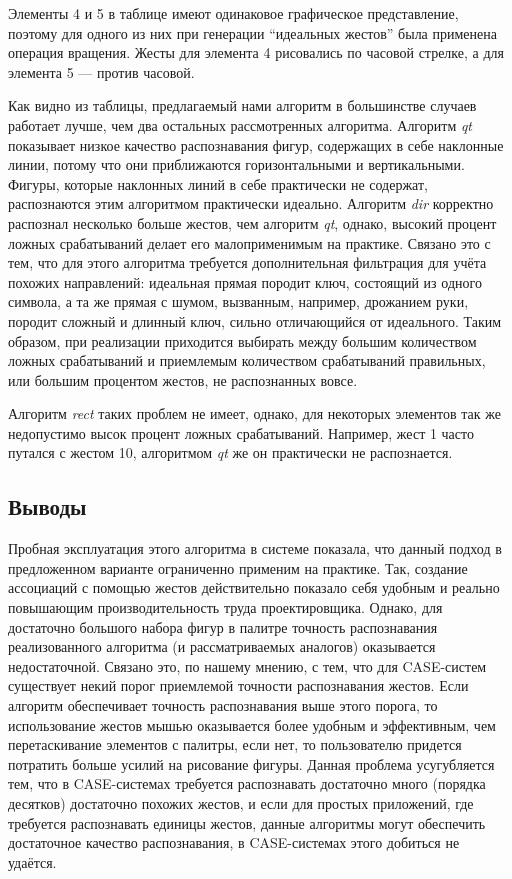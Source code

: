 \documentclass[a5paper]{article}
\begin{document}
Элементы 4 и 5 в таблице имеют одинаковое графическое представление, поэтому для одного из них при генерации ``идеальных жестов'' была применена операция вращения. Жесты для элемента 4 рисовались по часовой стрелке, а для элемента 5 --- против часовой.

Как видно из таблицы, предлагаемый нами алгоритм в большинстве случаев работает лучше, чем два остальных рассмотренных алгоритма. Алгоритм \textit{qt} показывает низкое качество распознавания фигур, содержащих в себе наклонные линии, потому что они приближаются горизонтальными и вертикальными. Фигуры, которые наклонных линий в себе практически не содержат, распознаются этим алгоритмом практически идеально. Алгоритм \textit{dir} корректно распознал несколько больше жестов, чем алгоритм \textit{qt}, однако, высокий процент ложных срабатываний делает его малоприменимым на практике. Связано это с тем, что для этого алгоритма требуется дополнительная фильтрация для учёта похожих направлений: идеальная прямая породит ключ, состоящий из одного символа, а та же прямая с шумом, вызванным, например, дрожанием руки, породит сложный и длинный ключ, сильно отличающийся от идеального. Таким образом, при реализации приходится выбирать между большим количеством ложных срабатываний и приемлемым количеством срабатываний правильных, или большим процентом жестов, не распознанных вовсе.

Алгоритм \textit{rect} таких проблем не имеет, однако, для некоторых элементов так же недопустимо высок процент ложных срабатываний. Например, жест 1 часто путался с жестом 10, алгоритмом \textit{qt} же он практически не распознается. 

\subsection{Выводы}
Пробная эксплуатация этого алгоритма в системе показала, что данный подход в предложенном варианте ограниченно применим на практике. Так, создание ассоциаций с помощью жестов действительно показало себя удобным и реально повышающим производительность труда проектировщика. Однако, для достаточно большого набора фигур в палитре точность распознавания реализованного алгоритма (и рассматриваемых аналогов) оказывается недостаточной. Связано это, по нашему мнению, с тем, что для CASE-систем существует некий порог приемлемой точности распознавания жестов. Если алгоритм обеспечивает точность распознавания выше этого порога, то использование жестов мышью оказывается более удобным и эффективным, чем перетаскивание элементов с палитры, если нет, то пользователю придется потратить больше усилий на рисование фигуры. Данная проблема усугубляется тем, что в CASE-системах требуется распознавать достаточно много (порядка десятков) достаточно похожих жестов, и если для простых приложений, где требуется распознавать единицы жестов, данные алгоритмы могут обеспечить достаточное качество распознавания, в CASE-системах этого добиться не удаётся.
\end{document}

